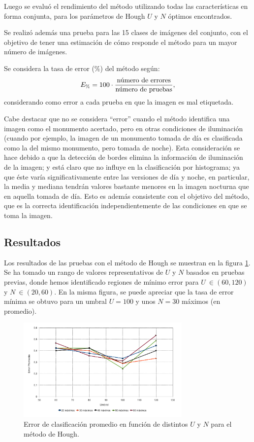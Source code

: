 \documentclass[conference,spanish,a4paper,10pt,oneside,final]{tfmpd}
\begin{document}
Luego se evaluó el rendimiento del método utilizando todas las características %
en forma conjunta, para los parámetros de Hough $U$ y $N$ óptimos encontrados.

Se realizó además una prueba para las 15 clases de imágenes %
del conjunto,
con el objetivo de tener una estimación de cómo responde %
el método para un mayor número de imágenes.

Se considera la tasa de error ($\%$) del método según:
\begin{equation}
E_\%=100\cdot\frac{\textrm{número de errores}}{\textrm{número de pruebas}},
\end{equation}
considerando como error a cada prueba en que la imagen es mal etiquetada.

Cabe destacar que no se considera %
``error'' %
cuando el método identifica
una imagen como el monumento acertado, pero en otras
condiciones de iluminación (cuando por ejemplo, la imagen de un monumento
tomada de día es clasificada como la del mismo monumento, pero tomada de noche).
Esta consideración se hace debido a que la detección de bordes elimina la
información de iluminación de la imagen; y está claro que no influye
en la clasificación por histograma; ya que éste varía significativamente
entre las versiones de día y noche, en particular, la media y mediana tendrán
valores bastante menores en la imagen nocturna que en aquella tomada de día.
Esto es además consistente con el objetivo del método, que es la correcta
identificación independientemente de las condiciones en que se toma la imagen.
%
%
\subsection{Resultados}

Los resultados de las pruebas con el método de Hough se muestran en la figura
\ref{graficaerror}. Se ha tomado un rango de valores representativos de $U$
y $N$ basados en pruebas previas, donde hemos identificado regiones de mínimo
error para $U~\in(60,120)$ y $N~\in(20,60)$.
En la misma figura, se puede apreciar que la tasa de error mínima se obtuvo
para un umbral $U = 100$ y unos $N = 30$ máximos (en promedio).

\begin{figure}
\begin{center}
\includegraphics[width=8.5cm]{../diagramas/estadistica_noche_iguales} 
\end{center}
\caption{Error de clasificación promedio en función de distintos $U$ y $N$ para
el método de Hough.}
\label{graficaerror}
\end{figure}
\end{document}
